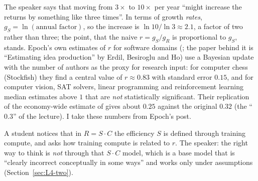 \begin{beyond}
The speaker says that moving from $3\times$ to $10\times$ per year ``might increase the returns by something like three times''. In terms of growth \emph{rates}, $g_S=\ln(\text{annual factor})$, so the increase is $\ln10/\ln3\approx2.1$, a factor of two rather than three; the point, that the naive $r=g_S/g_R$ is proportional to $g_S$, stands. Epoch's own estimates of $r$ for software domains (\citealp{besiroglu2024}; the paper behind it is ``Estimating idea production'' by Erdil, Besiroglu and Ho) use a Bayesian update with the number of authors as the proxy for research input: for computer chess (Stockfish) they find a central value of $r\approx0.83$ with standard error $0.15$, and for computer vision, SAT solvers, linear programming and reinforcement learning median estimates above $1$ that are \emph{not} statistically significant. Their replication of the economy-wide estimate of \citet{bloom2020} gives about $0.25$ against the original $0.32$ (the ``$0.3$'' of the lecture). I take these numbers from Epoch's post.
\end{beyond}

\begin{discussion}
A student notices that in $R=S\cdot C$ the efficiency $S$ is defined through training compute, and asks how training compute is related to $r$. The speaker: the right way to think is \emph{not} through that $S\cdot C$ model, which is a base model that is ``clearly incorrect conceptually in some ways'' and works only under assumptions (Section~\ref{sec:L4-two}).
\end{discussion}


